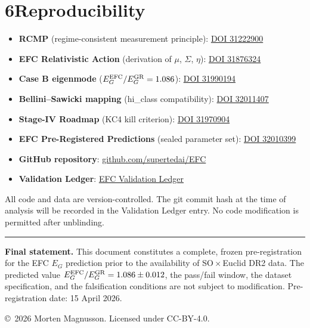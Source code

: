 \documentclass[11pt]{article}
\begin{document}
\section{6\quad Reproducibility}

\begin{sloppypar}
\begin{itemize}[itemsep=2pt]
\item \textbf{RCMP} (regime-consistent measurement principle):
  \href{https://doi.org/10.6084/m9.figshare.31222900}{DOI 31222900}
\item \textbf{EFC Relativistic Action} (derivation of $\mu$, $\Sigma$, $\eta$):
  \href{https://doi.org/10.6084/m9.figshare.31876324}{DOI 31876324}
\item \textbf{Case B eigenmode} ($E_G^{\rm EFC}/E_G^{\rm GR} = 1.086$):
  \href{https://doi.org/10.6084/m9.figshare.31990194}{DOI 31990194}
\item \textbf{Bellini--Sawicki mapping} (hi\_class compatibility):
  \href{https://doi.org/10.6084/m9.figshare.32011407}{DOI 32011407}
\item \textbf{Stage-IV Roadmap} (KC4 kill criterion):
  \href{https://doi.org/10.6084/m9.figshare.31970904}{DOI 31970904}
\item \textbf{EFC Pre-Registered Predictions} (sealed parameter set):
  \href{https://doi.org/10.6084/m9.figshare.32010399}{DOI 32010399}
\item \textbf{GitHub repository}:
  \href{https://github.com/supertedai/EFC}{github.com/supertedai/EFC}
\item \textbf{Validation Ledger}:
  \href{https://supertedai.github.io/EFC/public/EFC_Validation_Ledger.html}{EFC Validation Ledger}
\end{itemize}
\end{sloppypar}

All code and data are version-controlled. The git commit hash at the
time of analysis will be recorded in the Validation Ledger entry.
No code modification is permitted after unblinding.

\vspace{8pt}
\hrule
\vspace{6pt}
\begin{sloppypar}
\small
\textbf{Final statement.}
This document constitutes a complete, frozen pre-registration for the
EFC $E_G$ prediction prior to the availability of SO\,$\times$\,Euclid
DR2 data. The predicted value $E_G^{\rm EFC}/E_G^{\rm GR} = 1.086 \pm 0.012$,
the pass/fail window, the dataset specification, and the falsification
conditions are not subject to modification. Pre-registration date:
15 April 2026.

\vspace{4pt}
\copyright\ 2026 Morten Magnusson. Licensed under CC-BY-4.0.
\end{sloppypar}
\end{document}
